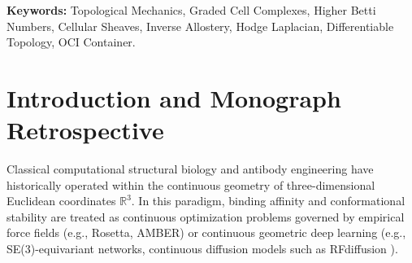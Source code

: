 \documentclass[11pt, a4paper]{article}
\theoremstyle{definition}
\theoremstyle{plain}
\theoremstyle{remark}
\begin{document}
\vspace{1em}
\noindent\textbf{Keywords:} Topological Mechanics, Graded Cell Complexes, Higher Betti Numbers, Cellular Sheaves, Inverse Allostery, Hodge Laplacian, Differentiable Topology, OCI Container.

\newpage

\section{Introduction and Monograph Retrospective}
\label{sec:introduction}

Classical computational structural biology and antibody engineering have historically operated within the continuous geometry of three-dimensional Euclidean coordinates $\mathbb{R}^3$. In this paradigm, binding affinity and conformational stability are treated as continuous optimization problems governed by empirical force fields (e.g., Rosetta, AMBER) or continuous geometric deep learning (e.g., SE(3)-equivariant networks, continuous diffusion models such as RFdiffusion \cite{watson2023novo}). 
\end{document}
